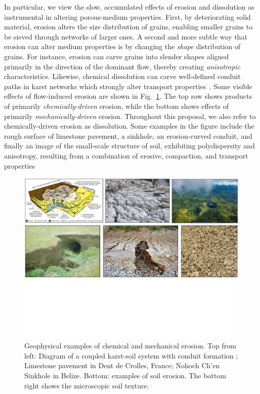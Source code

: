 \documentclass[11pt]{article}
\begin{document}
In particular, we view the slow, accumulated effects of erosion and dissolution as instrumental in altering porous-medium properties. First, by deteriorating solid material, erosion alters the size distribution of grains, enabling smaller grains to be sieved through networks of larger ones. A second and more subtle way that erosion can alter medium properties is by changing the {\em shape} distribution of grains. For instance, erosion can carve grains into slender shapes aligned primarily in the direction of the dominant flow, thereby creating {\em anisotropic} characteristics. Likewise, chemical dissolution can carve well-defined conduit paths in karst networks which strongly alter transport properties~\cite{szymczak2009wormhole}. Some visible effects of flow-induced erosion are shown in Fig.~\ref{collage}. The top row shows products of primarily {\em chemically-driven} erosion, while the bottom shows effects of primarily {\em mechanically-driven} erosion. Throughout this proposal, we also refer to chemically-driven erosion as dissolution. Some examples in the figure include the rough surface of limestone pavement, a sinkhole, an erosion-curved conduit, and finally an image of the small-scale structure of soil, exhibiting polydispersity and anisotropy, resulting from a combination of erosive, compaction, and transport properties

\begin{figure}%
\begin{center}
\includegraphics[width = 0.99 \textwidth]{./figs/collage.pdf}
\caption{\label{collage} Geophysical examples of chemical and mechanical erosion. Top from left: Diagram of a coupled karst-soil system with conduit formation \cite{watson2019sinkholes}; Limestone pavement in Dent de Crolles, France; Nohoch Ch’en Sinkhole in Belize. Bottom: examples of soil erosion. The bottom right shows the microscopic soil texture.}
\end{center}
\end{figure}
\end{document}
